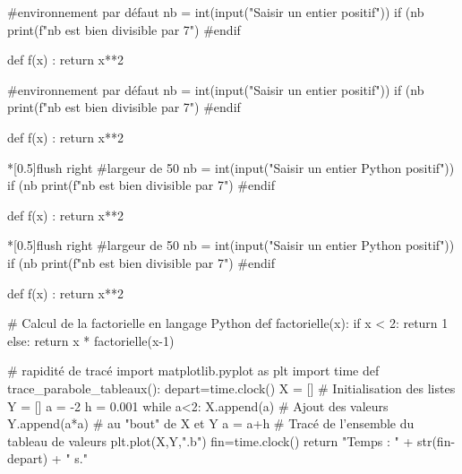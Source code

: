 \documentclass[a4paper,french,11pt]{article}
\begin{document}
\begin{codetex}
\begin{CodePythonLst}{} %
#environnement par défaut
nb = int(input("Saisir un entier positif"))
if (nb %
	print(f"{nb} est bien divisible par 7")
#endif

def f(x) :
	return x**2
\end{CodePythonLst}
\end{codetex}

\begin{codesortie}
\begin{CodePythonLst}{}
#environnement par défaut
nb = int(input("Saisir un entier positif"))
if (nb %
	print(f"{nb} est bien divisible par 7")
#endif

def f(x) :
	return x**2
\end{CodePythonLst}
\end{codesortie}

\begin{codetex}
\begin{CodePythonLst}*[0.5\linewidth]{flush right}
#largeur de 50%
nb = int(input("Saisir un entier Python positif"))
if (nb %
	print(f"{nb} est bien divisible par 7")
#endif

def f(x) :
	return x**2
\end{CodePythonLst}
\end{codetex}

\begin{codesortie}
\begin{CodePythonLst}*[0.5\linewidth]{flush right}
#largeur de 50%
nb = int(input("Saisir un entier Python positif"))
if (nb %
	print(f"{nb} est bien divisible par 7")
#endif

def f(x) :
	return x**2
\end{CodePythonLst}
\end{codesortie}

\begin{codetex}
\begin{scontents}[overwrite,write-out=testscript.py]
# Calcul de la factorielle en langage Python
def factorielle(x):
	if x < 2:
		return 1
	else:
		return x * factorielle(x-1)

# rapidité de tracé
import matplotlib.pyplot as plt
import time
def trace_parabole_tableaux():
	depart=time.clock()
	X = [] # Initialisation des listes
	Y = []
	a = -2
	h = 0.001
	while a<2:
		X.append(a) # Ajout des valeurs
		Y.append(a*a) # au "bout" de X et Y
		a = a+h
	# Tracé de l'ensemble du tableau de valeurs
	plt.plot(X,Y,".b")
	fin=time.clock()
	return "Temps : " + str(fin-depart) + " s."
\end{scontents}

\end{codetex}
\end{document}
